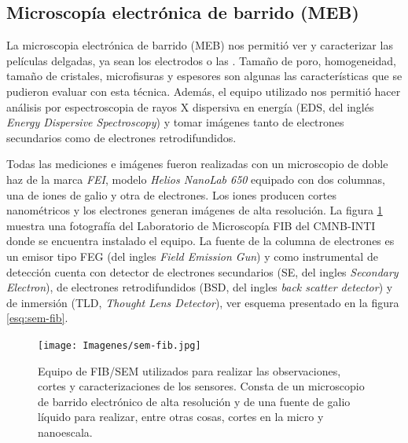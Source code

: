 	\subsection{Microscopía electrónica de barrido (MEB)}\label{sec:SEM}

		La microscopia electrónica de barrido (MEB) nos permitió ver y caracterizar las películas delgadas, ya sean los electrodos o las \pdm. Tamaño de poro, homogeneidad, tamaño de cristales, microfisuras y espesores son algunas las características que se pudieron evaluar con esta técnica. Además, el equipo utilizado nos permitió hacer análisis por espectroscopia de rayos X dispersiva en energía (EDS, del inglés \textit{Energy Dispersive Spectroscopy}) y tomar imágenes tanto de electrones secundarios como de electrones retrodifundidos. \cite{Goodhew2000,Watt1997}

		Todas las mediciones e imágenes fueron realizadas con un microscopio de doble haz de la marca \textit{FEI}, modelo \textit{Helios NanoLab 650} equipado con dos columnas, una de iones de galio y otra de electrones. Los iones producen cortes nanométricos y los electrones generan imágenes de alta resolución. La figura \ref{fig:sem-fib} muestra una fotografía del Laboratorio de Microscopía FIB del CMNB-INTI donde se encuentra instalado el equipo. La fuente de la columna de electrones es un emisor tipo FEG (del ingles \textit{Field Emission Gun}) y como instrumental de detección cuenta con detector de electrones secundarios (SE, del ingles \textit{Secondary Electron}), de electrones retrodifundidos (BSD, del ingles \textit{back scatter detector}) y de inmersión (TLD, \textit{Thought Lens Detector}), ver esquema presentado en la figura \ref{esq:sem-fib}. 

				\begin{figure}[bh!]
			 		  \begin{center}
			 		  \texttt{[image: Imagenes/sem-fib.jpg]}
			 		  \caption[Microscopio de doble haz FIB/SEM]{Equipo de FIB/SEM utilizados para realizar las observaciones, cortes y caracterizaciones de los sensores. Consta de un microscopio de barrido electrónico de alta resolución y de una fuente de galio líquido para realizar, entre otras cosas, cortes en la micro y nanoescala.}
			 		  \label{fig:sem-fib}
			 		  \end{center}
			 		  \end{figure}
	
